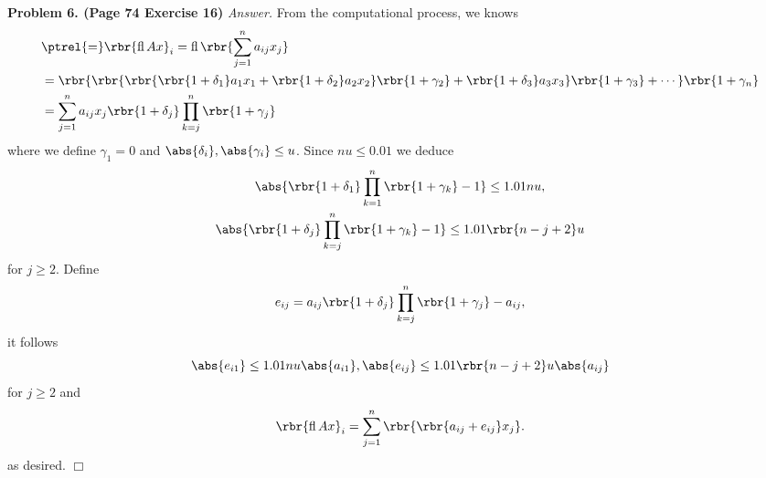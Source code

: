 \documentclass[english, nochinese]{pnote}
\DeclareMathOperator\opfl{\mathrm{fl}}
\begin{document}
\textbf{Problem 6. (Page 74 Exercise 16)} \textit{Answer.} From the computational process, we knows
\begin{equation}
\begin{split}
&\ptrel{=} \rbr{\opfl{ A x }}_i = \opfl \rbr{ \sum_{ j = 1 }^n a_{ i j } x_j } \\
&= \rbr{ \rbr{ \rbr{ \rbr{ 1 + \delta_1 } a_1 x_1 + \rbr{ 1 + \delta_2 } a_2 x_2 } \rbr{ 1 + \gamma_2 } + \rbr{ 1 + \delta_3 } a_3 x_3 } \rbr{ 1 + \gamma_3 } + \cdots } \rbr{ 1 + \gamma_n } \\
&= \sum_{ j = 1 }^n a_{ i j } x_j \rbr{ 1 + \delta_j } \prod_{ k = j }^n \rbr{ 1 + \gamma_j }
\end{split}
\end{equation}
where we define $ \gamma_1 = 0 $ and $ \abs{\delta_i}, \abs{\gamma_i} \le u $. Since $ n u \le 0.01 $ we deduce
\begin{gather}
\abs{ \rbr{ 1 + \delta_1 } \prod_{ k = 1 }^n \rbr{ 1 + \gamma_k } - 1 } \le 1.01 n u, \\
\abs{ \rbr{ 1 + \delta_j } \prod_{ k = j }^n \rbr{ 1 + \gamma_k } - 1 } \le 1.01 \rbr{ n - j + 2 } u
\end{gather}
for $ j \ge 2 $. Define
\begin{equation}
e_{ i j } = a_{ i j } \rbr{ 1 + \delta_j } \prod_{ k = j }^n \rbr{ 1 + \gamma_j } - a_{ i j },
\end{equation}
it follows
\begin{equation}
\abs{e_{ i 1 }} \le 1.01 n u \abs{a_{ i 1 }}, \\
\abs{e_{ i j }} \le 1.01 \rbr{ n - j + 2 } u \abs{a_{ i j }}
\end{equation}
for $ j \ge 2 $ and
\begin{equation}
\rbr{ \opfl A x }_i = \sum_{ j = 1 }^n \rbr{ \rbr{ a_{ i j } + e_{ i j } } x_j }.
\end{equation}
as desired.
\hfill$\Box$
\end{document}
